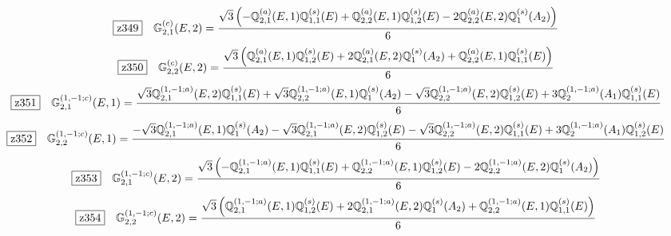 \documentclass[fleqn,10pt,landscape]{jsarticle}
\begin{document}
\begin{dmath*}
\hspace*{3mm}\fbox{z349}\quad \mathbb{G}_{2,1}^{(c)}(E,2)=\frac{\sqrt{3} \left(- \mathbb{Q}_{2,1}^{(a)}(E,1) \mathbb{Q}_{1,1}^{(s)}(E) + \mathbb{Q}_{2,2}^{(a)}(E,1) \mathbb{Q}_{1,2}^{(s)}(E) - 2 \mathbb{Q}_{2,2}^{(a)}(E,2) \mathbb{Q}_{1}^{(s)}(A_{2})\right)}{6}
\end{dmath*}
\begin{dmath*}
\hspace*{3mm}\fbox{z350}\quad \mathbb{G}_{2,2}^{(c)}(E,2)=\frac{\sqrt{3} \left(\mathbb{Q}_{2,1}^{(a)}(E,1) \mathbb{Q}_{1,2}^{(s)}(E) + 2 \mathbb{Q}_{2,1}^{(a)}(E,2) \mathbb{Q}_{1}^{(s)}(A_{2}) + \mathbb{Q}_{2,2}^{(a)}(E,1) \mathbb{Q}_{1,1}^{(s)}(E)\right)}{6}
\end{dmath*}
\begin{dmath*}
\hspace*{3mm}\fbox{z351}\quad \mathbb{G}_{2,1}^{(1,-1;c)}(E,1)=\frac{\sqrt{3} \mathbb{Q}_{2,1}^{(1,-1;a)}(E,2) \mathbb{Q}_{1,1}^{(s)}(E) + \sqrt{3} \mathbb{Q}_{2,2}^{(1,-1;a)}(E,1) \mathbb{Q}_{1}^{(s)}(A_{2}) - \sqrt{3} \mathbb{Q}_{2,2}^{(1,-1;a)}(E,2) \mathbb{Q}_{1,2}^{(s)}(E) + 3 \mathbb{Q}_{2}^{(1,-1;a)}(A_{1}) \mathbb{Q}_{1,1}^{(s)}(E)}{6}
\end{dmath*}
\begin{dmath*}
\hspace*{3mm}\fbox{z352}\quad \mathbb{G}_{2,2}^{(1,-1;c)}(E,1)=\frac{- \sqrt{3} \mathbb{Q}_{2,1}^{(1,-1;a)}(E,1) \mathbb{Q}_{1}^{(s)}(A_{2}) - \sqrt{3} \mathbb{Q}_{2,1}^{(1,-1;a)}(E,2) \mathbb{Q}_{1,2}^{(s)}(E) - \sqrt{3} \mathbb{Q}_{2,2}^{(1,-1;a)}(E,2) \mathbb{Q}_{1,1}^{(s)}(E) + 3 \mathbb{Q}_{2}^{(1,-1;a)}(A_{1}) \mathbb{Q}_{1,2}^{(s)}(E)}{6}
\end{dmath*}
\begin{dmath*}
\hspace*{3mm}\fbox{z353}\quad \mathbb{G}_{2,1}^{(1,-1;c)}(E,2)=\frac{\sqrt{3} \left(- \mathbb{Q}_{2,1}^{(1,-1;a)}(E,1) \mathbb{Q}_{1,1}^{(s)}(E) + \mathbb{Q}_{2,2}^{(1,-1;a)}(E,1) \mathbb{Q}_{1,2}^{(s)}(E) - 2 \mathbb{Q}_{2,2}^{(1,-1;a)}(E,2) \mathbb{Q}_{1}^{(s)}(A_{2})\right)}{6}
\end{dmath*}
\begin{dmath*}
\hspace*{3mm}\fbox{z354}\quad \mathbb{G}_{2,2}^{(1,-1;c)}(E,2)=\frac{\sqrt{3} \left(\mathbb{Q}_{2,1}^{(1,-1;a)}(E,1) \mathbb{Q}_{1,2}^{(s)}(E) + 2 \mathbb{Q}_{2,1}^{(1,-1;a)}(E,2) \mathbb{Q}_{1}^{(s)}(A_{2}) + \mathbb{Q}_{2,2}^{(1,-1;a)}(E,1) \mathbb{Q}_{1,1}^{(s)}(E)\right)}{6}
\end{dmath*}
\end{document}
